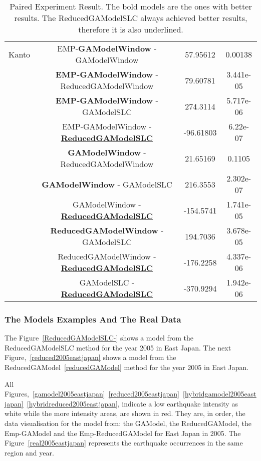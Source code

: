 \begin{table*}[]
\begin{center}
\begin{tabular}{|c|c|c|c|}
      
      \hline
      Kanto & EMP-\textbf{GAModelWindow} - GAModelWindow &
      57.95612 & 0.00138\\
      & \textbf{EMP-GAModelWindow} - ReducedGAModelWindow &
      79.60781 & 3.441e-05\\
      & \textbf{EMP-GAModelWindow} - GAModelSLC &
      274.3114  & 5.717e-06\\
      & EMP-GAModelWindow - \underline{\textbf{ReducedGAModelSLC}} & 
      -96.61803  & 6.22e-07\\
      & \textbf{GAModelWindow} - ReducedGAModelWindow & 
      21.65169  & 0.1105\\
      &\textbf{GAModelWindow} - GAModelSLC &
      216.3553  & 2.302e-07\\
      & GAModelWindow - \underline{\textbf{ReducedGAModelSLC}} &
      -154.5741  & 1.741e-05\\
      & \textbf{ReducedGAModelWindow} - GAModelSLC &
      194.7036  & 3.678e-05\\
      & ReducedGAModelWindow -\underline{\textbf{ReducedGAModelSLC}} &
      -176.2258 & 4.337e-06\\
      & GAModelSLC - \underline{\textbf{ReducedGAModelSLC}} &
      -370.9294 &1.942e-06\\
      \hline
    \end{tabular}
  \end{center}
  \caption{Paired Experiment Result. The bold models are the ones with
    better results. The ReducedGAModelSLC always achieved better
    results, therefore it is also underlined.}
  \label{Paired}
\end{table*}



\subsubsection{The Models Examples And The Real Data}
The Figure~\ref{ReducedGAModelSLC-} shows a model from the
ReducedGAModelSLC method for the year 2005 in East Japan. The next
Figure,~\ref{reduced2005eastjapan} shows a model from the
ReducedGAModel~\ref{reducedGAModel} method for the year 2005 in East
Japan.

All
Figures,~\ref{gamodel2005eastjapan}~\ref{reduced2005eastjapan}~\ref{hybridgamodel2005eastjapan}~\ref{hybridreduced2005eastjapan},
indicate a low earthquake intensity as white while the more intensity
areas, are shown in red. They are, in order, the data visualisation
for the model from: the GAModel, the ReducedGAModel, the Emp-GAModel
and the Emp-ReducedGAModel for East Japan in 2005. The
Figure~\ref{real2005eastjapan} represents the earthquake occurrences
in the same region and year.


